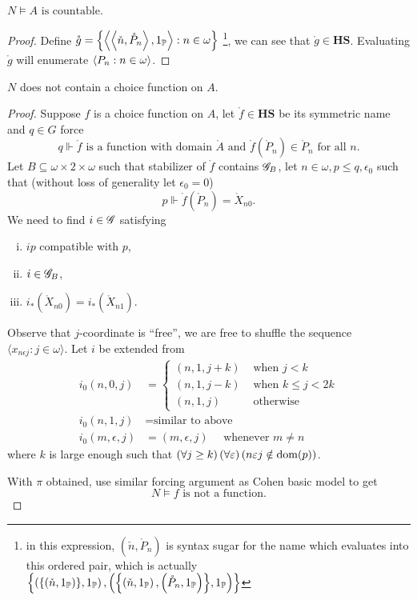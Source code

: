 \begin{lemma}
    \(N\models A\text{ is countable}\).
\end{lemma}
\begin{proof}
  Define \(\mathring{g} = {\left\{ \left\langle\left\langle\check{n}, \mathring{P}_n\right\rangle, 1_{\mathbb{P}}\right\rangle: n\in\omega \right\}}\)
  \footnote{in this expression, \((\check{n}, \mathring{P}_n)\) is syntax sugar for the name which evaluates into this ordered pair,
  which is actually \({\left\{ \left({\left\{ \left(\check{n},1_{\mathbb{P}}\right) \right\}},1_{\mathbb{P}}\right),\left({\left\{ \left(\check{n},1_{\mathbb{P}}\right),\left(\mathring{P}_n,1_{\mathbb{P}}\right) \right\}},1_{\mathbb{P}}\right) \right\}}\)},
  we can see that \(\mathring{g}\in \mathbf{HS}\).
  Evaluating \(\mathring{g}\) will enumerate \(\left\langle P_n: n\in\omega \right\rangle\).
\end{proof}

\begin{theorem}
    \(N\) does not contain a choice function on \(A\).
\end{theorem}
\begin{proof}
Suppose \(f\) is a choice function on \(A\), let \(\mathring{f}\in\mathbf{HS}\) be its symmetric name and \(q\in G\) force
\[q\Vdash \mathring{f}\text{ is a function with domain } \mathring{A} \text{ and } \mathring{f}(\mathring{P}_n) \in \mathring{P}_n\text{ for all }n .\]
Let \(B\subseteq \omega\times2\times\omega\) such that stabilizer of \(\mathring{f}\) contains \(\mathscr{G}_B\),
let \(n\in\omega, p\leq q, \epsilon_0\) such that (without loss of generality let \(\epsilon_0 = 0\))
\[ p\Vdash \mathring{f}(\mathring{P}_n) = \mathring{X}_{n0}. \]
We need to find \(i\in\mathscr{G}\) satisfying
\begin{enumerate}[i.]
    \item \(i p\) compatible with \(p\),
    \item \(i \in \mathscr{G}_B\),
    \item \(i_*(\mathring{X}_{n0}) = i_*(\mathring{X}_{n1})\).
\end{enumerate}
Observe that \(j\)-coordinate is ``free'',
we are free to shuffle the sequence \(\langle x_{n\epsilon j}:j\in\omega\rangle\).
Let \(i\) be extended from
\begin{align*}
    i_0(n,0,j) &=
    \begin{cases}
        (n,1,j+k) &\text{ when } j < k \\
        (n,1,j-k) &\text{ when } k \leq j < 2k \\
        (n,1,j) &\text{ otherwise}
    \end{cases} \\
    i_0(n,1,j) &= \text{similar to above} \\
    i_0(m,\epsilon,j) &= (m,\epsilon,j) \quad\text{ whenever }m \ne n
\end{align*}
where \(k\) is large enough such that \(\left(\forall j\geq k\right)\left(\forall\varepsilon\right)\left(n\varepsilon j \notin \operatorname{dom}(p)\right)\).

With \(\pi\) obtained, use similar forcing argument as Cohen basic model to get
\[ N\models f\text{ is not a function}. \tag*{\qedhere} \]
\end{proof}
